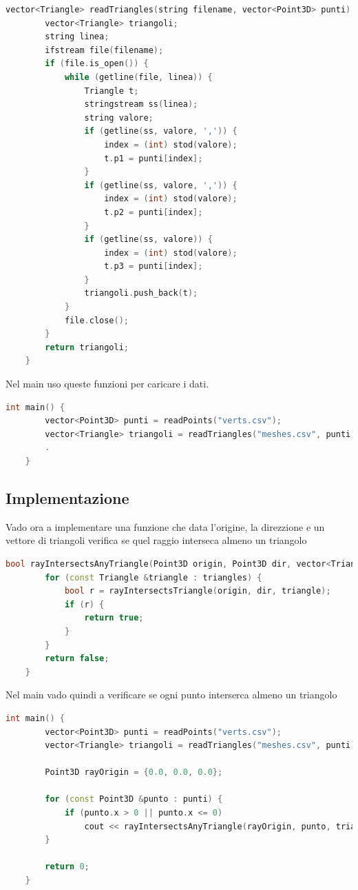 \documentclass[a4paper]{article}
\begin{document}
\begin{lstlisting}[language=c++]
    vector<Triangle> readTriangles(string filename, vector<Point3D> punti) {
        vector<Triangle> triangoli;
        string linea;
        ifstream file(filename);
        if (file.is_open()) {
            while (getline(file, linea)) {
                Triangle t;
                stringstream ss(linea);
                string valore;
                if (getline(ss, valore, ',')) {
                    index = (int) stod(valore);
                    t.p1 = punti[index];
                }
                if (getline(ss, valore, ',')) {
                    index = (int) stod(valore);
                    t.p2 = punti[index];
                }
                if (getline(ss, valore)) {
                    index = (int) stod(valore);
                    t.p3 = punti[index];
                }
                triangoli.push_back(t);
            }
            file.close();
        }
        return triangoli;
    }
\end{lstlisting}

Nel main uso queste funzioni per caricare i dati.

\begin{lstlisting}[language=c++]
    int main() {
        vector<Point3D> punti = readPoints("verts.csv");
        vector<Triangle> triangoli = readTriangles("meshes.csv", punti);
        .
    } 
\end{lstlisting}

\newpage

\subsection{Implementazione}

Vado ora a implementare una funzione che data l'origine, la direzzione e un vettore di triangoli verifica se quel raggio interseca almeno un triangolo

\begin{lstlisting}[language=c++]
    bool rayIntersectsAnyTriangle(Point3D origin, Point3D dir, vector<Triangle> triangles) {
        for (const Triangle &triangle : triangles) {
            bool r = rayIntersectsTriangle(origin, dir, triangle);
            if (r) {
                return true;
            }
        }
        return false;
    }
\end{lstlisting}

Nel main vado quindi a verificare se ogni punto interserca almeno un triangolo

\begin{lstlisting}[language=c++]
    int main() {
        vector<Point3D> punti = readPoints("verts.csv");
        vector<Triangle> triangoli = readTriangles("meshes.csv", punti);

        Point3D rayOrigin = {0.0, 0.0, 0.0};

        for (const Point3D &punto : punti) {
            if (punto.x > 0 || punto.x <= 0)
                cout << rayIntersectsAnyTriangle(rayOrigin, punto, triangoli) << endl;
        }
        
        return 0;
    } 
\end{lstlisting}
\end{document}
